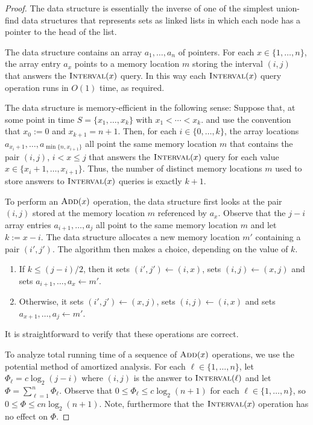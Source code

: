 \documentclass[kpfonts]{patmorin}
\let\le\leqslant
\begin{document}
\begin{proof}
    The data structure is essentially the inverse of one of the simplest union-find data structures that represents sets as linked lists in which each node has a pointer to the head of the list.

    The data structure contains an array $a_1,\ldots,a_n$ of pointers.  For each $x\in\{1,\ldots,n\}$, the array entry $a_x$ points to a memory location $m$ storing the interval $(i,j)$ that answers the $\textsc{Interval}(x)$ query.  In this way each $\textsc{Interval}(x)$ query operation runs in $O(1)$ time, as required.

    The data structure is memory-efficient in the following sense: Suppose that, at some point in time $S=\{x_1,\ldots,x_k\}$ with $x_1<\cdots<x_k$.   and use the convention that $x_0:=0$ and $x_{k+1}=n+1$.  Then, for each $i\in \{0,\ldots,k\}$, the array locations $a_{x_{i}+1},\ldots,a_{\min\{n,x_{i+1}\}}$ all point the same memory location $m$ that contains the pair $(i,j)$, $i<x\le j$ that answers the $\textsc{Interval}(x)$ query for each value $x\in\{x_{i}+1,\ldots,x_{i+1}\}$.  Thus, the number of distinct memory locations $m$ used to store answers to $\textsc{Interval}(x)$ queries is exactly $k+1$.

    To perform an $\textsc{Add}(x)$ operation, the data structure first looks at the pair $(i,j)$ stored at the memory location $m$ referenced by $a_x$.
    Observe that the $j-i$ array entries $a_{i+1},\ldots,a_{j}$ all point to the same memory location $m$ and let $k:=x-i$.  The data structure allocates a new memory location $m'$ containing a pair $(i',j')$.  The algorithm then makes a choice, depending on the value of $k$.

    \begin{enumerate}
        \item If $k\le (j-i)/2$, then it sets $(i',j')\gets (i,x)$, sets $(i,j)\gets (x,j)$ and sets $a_{i+1},\ldots,a_{x}\gets m'$.
        \item Otherwise, it sets $(i',j')\gets (x,j)$, sets $(i,j)\gets (i,x)$ and sets $a_{x+1},\ldots,a_{j}\gets m'$.
    \end{enumerate}
    It is straightforward to verify that these operations are correct.

    To analyze total running time of a sequence of $\textsc{Add}(x)$ operations, we use the potential method of amortized analysis.  For each $\ell\in\{1,\ldots,n\}$, let $\Phi_\ell=c\log_2(j-i)$ where $(i,j)$ is the answer to $\textsc{Interval}(\ell)$ and let $\Phi=\sum_{\ell=1}^n \Phi_\ell$.  Observe that $0\le \Phi_\ell\le c\log_2(n+1)$ for each $\ell\in\{1,\ldots,n\}$, so $0\le \Phi\le cn\log_2(n+1)$. Note, furthermore that the $\textsc{Interval}(x)$ operation has no effect on $\Phi$.


\end{proof}
\end{document}
